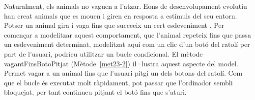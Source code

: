 
Naturalment, els animals no vaguen a l'atzar. Eons de desenvolupament evolutiu han creat animals que es mouen i giren en resposta a estímuls del seu entorn. Potser un animal gira i vaga fins que succeeix un cert esdeveniment . Per començar a modelitzar aquest comportament, que l'animal repeteix fins que passa un esdeveniment determinat, modelitzat aquí com un clic d'un botó del ratolí per part de l'usuari, podríeu utilitzar un bucle condicional. El mètode \textsf{vagantFinsBotoPitjat} (Mètode~\ref{met23-2}) il·lustra aquest aspecte del model. Permet vagar a un animal fins que l'usuari pitgi un dels botons del ratolí. Com que el bucle és executat molt ràpidament, pot passar que l'ordinador sembli bloquejat, per tant continueu pitjant el botó fins que s'aturi.


